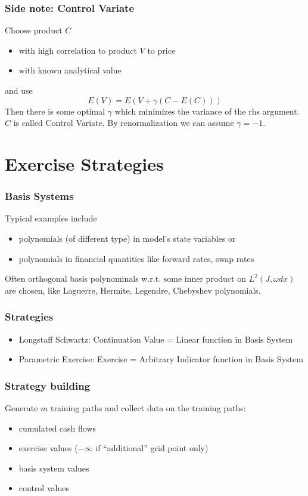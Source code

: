 \documentclass{beamer}
\begin{document}
\begin{frame}
\frametitle{Side note: Control Variate}
Choose product $C$
\vspace{\baselineskip}
\begin{itemize}
\item with high correlation to product $V$ to price
\item with known analytical value
\end{itemize}
\vspace{\baselineskip}
and use
\begin{equation}
E(V) = E(V+\gamma(C-E(C)))
\end{equation}
Then there is some optimal $\gamma$ which minimizes the variance of the rhs argument. $C$ is called Control Variate. By renormalization we can assume $\gamma = -1$.
\end{frame}

\section{Exercise Strategies}

\begin{frame}
\frametitle{Basis Systems}
Typical examples include
\vspace{\baselineskip}
\begin{itemize}
\item polynomials (of different type) in model's state variables or
\item polynomials in financial quantities like forward rates, swap rates
\end{itemize}
Often orthogonal basis polynominals w.r.t. some inner product on $L^2( J , \omega dx)$ are chosen, like Laguerre, 
Hermite, Legendre, Chebyshev polynomials.
\end{frame}

\begin{frame}
\frametitle{Strategies}
\vspace{\baselineskip}
\begin{itemize}
\item Longstaff Schwartz: Continuation Value = Linear function in Basis System
\item Parametric Exercise: Exercise = Arbitrary Indicator function in Basis System
\end{itemize}
\end{frame}

\begin{frame}
\frametitle{Strategy building}
Generate $m$ training paths and collect data on the training paths:
\vspace{\baselineskip}
\begin{itemize}
\item cumulated cash flows
\item exercise values ($-\infty$ if ``additional'' grid point only)
\item basis system values
\item control values
\end{itemize}
\end{frame}
\end{document}
